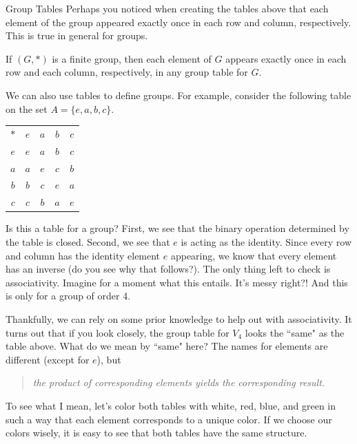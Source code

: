 \begin{section}{Group Tables}
Perhaps you noticed when creating the tables above that each element of the group appeared exactly once in each row and column, respectively.  This is true in general for groups.

\begin{theorem}
If $(G,*)$ is a finite group, then each element of $G$ appears exactly once in each row and each column, respectively, in any group table for $G$.
\end{theorem}

We can also use tables to define groups.  For example, consider the following table on the set $A=\{e,a,b,c\}$.

\begin{center}
\begin{tabular}{c!{\vrule width 2pt}c|c|c|c}
$*$ & $e$ & $a$ & $b$ & $c$ \\ 
$e$ & $e$ & $a$ & $b$ & $c$ \\
\hline $a$ & $a$ & $e$ & $c$ & $b$  \\
\hline $b$ & $b$ & $c$ & $e$ & $a$\\
\hline $c$ & $c$ & $b$ & $a$ & $e$
\end{tabular}
\end{center}

\noindent Is this a table for a group?  First, we see that the binary operation determined by the table is closed.  Second, we see that $e$ is acting as the identity.  Since every row and column has the identity element $e$ appearing, we know that every element has an inverse (do you see why that follows?).  The only thing left to check is associativity.  Imagine for a moment what this entails.  It's messy right?!  And this is only for a group of order 4.

Thankfully, we can rely on some prior knowledge to help out with associativity.  It turns out that if you look closely, the group table for $V_4$ looks the ``same" as the table above.  What do we mean by ``same" here?  The names for elements are different (except for $e$), but 
\begin{quotation}
\emph{the product of corresponding elements yields the corresponding result.}
\end{quotation}
To see what I mean, let's color both tables with white, red, blue, and green in such a way that each element corresponds to a unique color.  If we choose our colors wisely, it is easy to see that both tables have the same structure.


\end{section}
